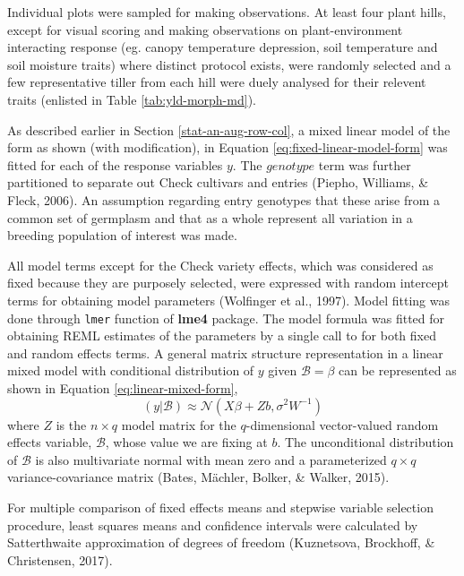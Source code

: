 \documentclass[12pt,oneside]{dukestatscithesis} %
\begin{document}
Individual plots were sampled for making observations. At least four plant hills, except for visual scoring and making observations on plant-environment interacting response (eg. canopy temperature depression, soil temperature and soil moisture traits) where distinct protocol exists, were randomly selected and a few representative tiller from each hill were duely analysed for their relevent traits (enlisted in Table \ref{tab:yld-morph-md}).

As described earlier in Section \ref{stat-an-aug-row-col}, a mixed linear model of the form as shown (with modification), in Equation \eqref{eq:fixed-linear-model-form} was fitted for each of the response variables
\(y\). The \(genotype\) term was further partitioned to separate out Check cultivars and entries (Piepho, Williams, \& Fleck, 2006). An assumption regarding entry genotypes that these arise from a common set of germplasm and that as a whole represent all variation in a breeding population of interest was made.

All model terms except for the Check variety effects, which was considered as fixed because they are purposely selected, were expressed with random intercept terms for obtaining model parameters (Wolfinger et al., 1997). Model fitting was done through \texttt{lmer} function of \textbf{lme4} package. The model formula was fitted for obtaining REML estimates of the parameters by a single call to for both fixed and random effects terms. A general matrix structure representation in a linear mixed model with conditional distribution of \(y\) given \(\mathcal{B} =\beta\) can be represented as shown in Equation \eqref{eq:linear-mixed-form},
\begin{equation}
(y|\mathcal{B}) \approx \mathcal{N}(X\beta + Zb, \sigma^{2}W^{-1})
\label{eq:linear-mixed-form}
\end{equation}
where \(Z\) is the \(n \times q\) model matrix for the \(q\)-dimensional vector-valued random effects variable, \(\mathcal{B}\), whose value we are fixing at \(b\). The unconditional distribution of \(\mathcal{B}\) is also multivariate normal with mean zero and a parameterized \(q \times q\) variance-covariance matrix (Bates, Mächler, Bolker, \& Walker, 2015).

For multiple comparison of fixed effects means and stepwise variable selection procedure, least squares means and confidence intervals were calculated by Satterthwaite approximation of degrees of freedom (Kuznetsova, Brockhoff, \& Christensen, 2017).
\end{document}
